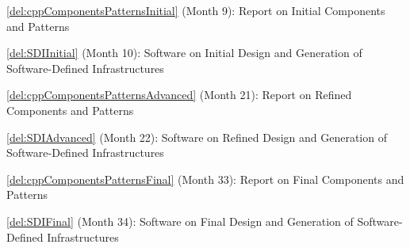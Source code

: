 \begin{Workpackage}{\thewpno}
\begin{WPDeliverables}
\begin{compactitem}
\item \ref{del:cppComponentsPatternsInitial} (Month 9): Report on Initial Components and Patterns
\item \ref{del:SDIInitial} (Month 10): Software on Initial Design and Generation of Software-Defined Infrastructures
\item \ref{del:cppComponentsPatternsAdvanced} (Month 21): Report on Refined Components and Patterns
\item \ref{del:SDIAdvanced} (Month 22): Software on Refined Design and Generation of Software-Defined Infrastructures
\item \ref{del:cppComponentsPatternsFinal} (Month 33): Report on Final Components and Patterns
\item \ref{del:SDIFinal} (Month 34): Software on Final Design and Generation of Software-Defined Infrastructures
\end{compactitem}
\end{WPDeliverables}
\end{Workpackage}
